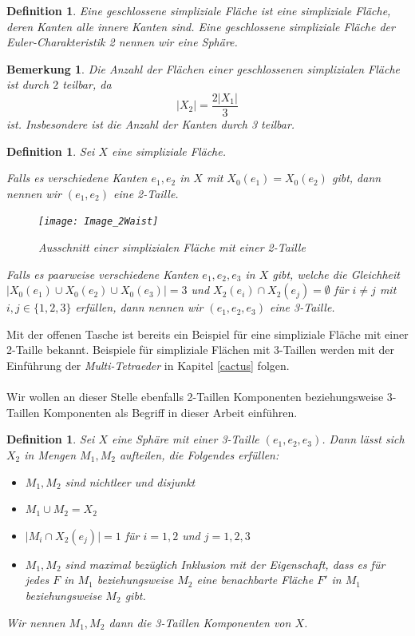 \documentclass[12pt,titlepage,twoside,cleardoublepage]{article}
\theoremstyle{nummermitklammern}
\newtheorem{definition}[temp]{Definition}
\newtheorem{bemerkung}[temp]{Bemerkung}
\newtheorem{definition}[zahl]{Definition}
\newtheorem{bemerkung}[zahl]{Bemerkung}
\numberwithin{equation}{section}
\begin{document}
\begin{definition} { \textsc{\cite{Rey}}} Eine \emph{geschlossene} simpliziale Fläche ist eine simpliziale Fläche, deren Kanten alle innere Kanten sind. Eine geschlossene simpliziale Fläche der Euler-Charakteristik  2 nennen wir eine \emph{Sphäre}.
\end{definition} 
\begin{bemerkung}{ \textsc{\cite{Rey}}}
Die Anzahl der Flächen einer geschlossenen simplizialen Fläche ist durch $2$ teilbar, da
\[
\vert X_{2} \vert = \frac{2\vert X_{1}\vert}{3}
\]
ist.
Insbesondere ist die Anzahl der Kanten durch 3 teilbar. 
\end{bemerkung}
\begin{definition}
Sei $X$ eine simpliziale Fläche.

 Falls es verschiedene Kanten $e_1,e_2$ in $X$ mit $X_0(e_1)=X_0(e_2)$ gibt, dann nennen wir $(e_1,e_2)$ eine 2-Taille.
 \begin{figure}[H]
\begin{center}
\texttt{[image: Image\_2Waist]}
\end{center}
\caption{Ausschnitt einer simplizialen Fläche mit einer 2-Taille}
\end{figure} 
 Falls es paarweise verschiedene Kanten $e_1,e_2,e_3$ in $X$ gibt, welche die Gleichheit $\vert X_0(e_1)\cup X_0(e_2)\cup X_0(e_3) \vert=3$ und $X_2(e_i)\cap X_2(e_j)=\emptyset$ für $i \neq j$ mit $i,j\in\{1,2,3\}  $ erfüllen, dann nennen wir $(e_1,e_2,e_3)$ eine 3-Taille. 
\end{definition}
Mit der offenen Tasche ist bereits ein Beispiel für eine simpliziale Fläche mit einer 2-Taille bekannt. Beispiele für simpliziale Flächen mit 3-Taillen werden mit der Einführung der \emph{Multi-Tetraeder} in Kapitel \ref{cactus} folgen. \\\\
Wir wollen an dieser Stelle ebenfalls 2-Taillen Komponenten beziehungsweise 3-Taillen Komponenten als Begriff in dieser Arbeit einführen.
\begin{definition} \label{2waistk}
Sei $X$ eine Sphäre mit einer 3-Taille $(e_1,e_2,e_3)$. Dann lässt sich $X_2$ in  Mengen $M_1,M_2$ aufteilen, die Folgendes erfüllen:
\begin{itemize}
\item $M_1,M_2$ sind nichtleer und disjunkt
\item $M_1\cup M_2=X_2$
\item $\vert M_i \cap X_2(e_j)\vert =1$ für $i=1,2$ und $j=1,2,3$
\item $M_1,M_2$ sind maximal bezüglich Inklusion mit der Eigenschaft, dass es für jedes $F$ in $M_1$ beziehungsweise $M_2$ eine benachbarte Fläche $F'$ in $M_1$ beziehungsweise $M_2$ gibt.
\end{itemize}  
Wir nennen $M_1,M_2$ dann die \emph{3-Taillen Komponenten} von $X$. 
\end{definition}
\end{document}
